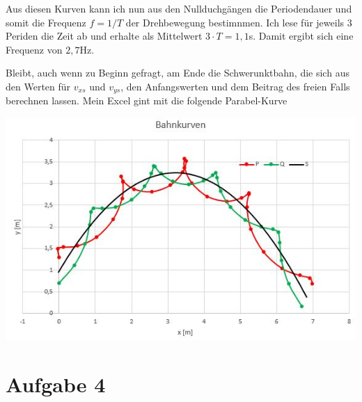 \documentclass{article}
\begin{document}
Aus diesen Kurven kann ich nun aus den Nullduchgängen die Periodendauer und somit die 
Frequenz $f=1/T$ der Drehbewegung bestimnmen. Ich lese für jeweils 3 Periden die Zeit ab und erhalte als Mittelwert $3\cdot T=1,1$s.
Damit ergibt sich eine Frequenz von $2,7$Hz. 

Bleibt, auch wenn zu Beginn gefragt, am Ende die Schwerunktbahn, die sich aus den Werten für $v_{xs}$ und $v_{ys}$, den Anfangswerten und dem Beitrag des freien Falls berechnen lassen.
Mein Excel gint mit die folgende Parabel-Kurve
\begin{center}
	\includegraphics[scale=0.8]{Schwerpunktbahn.JPG}
\end{center}


\section*{Aufgabe 4}
\end{document}
